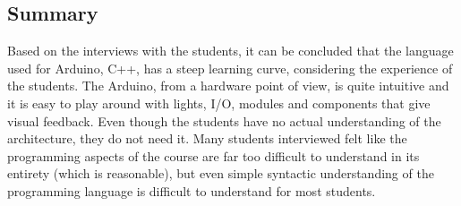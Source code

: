 \subsection{Summary}
Based on the interviews with the students, it can be concluded that the language used for Arduino, C++, has a steep learning curve, considering the experience of the students. 
The Arduino, from a hardware point of view, is quite intuitive and it is easy to play around with lights, I/O, modules and components that give visual feedback. 
Even though the students have no actual understanding of the architecture, they do not need it. 
Many students interviewed felt like the programming aspects of the course are far too difficult to understand in its entirety (which is reasonable), but even simple syntactic understanding of the programming language is difficult to understand for most students. 



